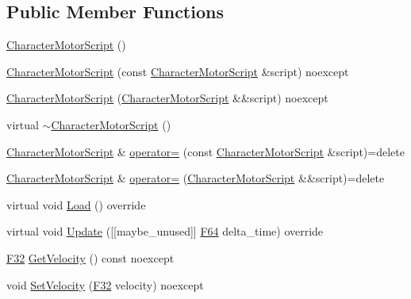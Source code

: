 \subsection*{Public Member Functions}
\begin{DoxyCompactItemize}
\item 
\hyperlink{classmage_1_1script_1_1_character_motor_script_ac5147e7eca438fe01cc0bedb2ce0a750}{Character\+Motor\+Script} ()
\item 
\hyperlink{classmage_1_1script_1_1_character_motor_script_a22c2bc0693a38f12182234ba842aa6f2}{Character\+Motor\+Script} (const \hyperlink{classmage_1_1script_1_1_character_motor_script}{Character\+Motor\+Script} \&script) noexcept
\item 
\hyperlink{classmage_1_1script_1_1_character_motor_script_ad822459ba8d2bbd5a30d598c41c5a281}{Character\+Motor\+Script} (\hyperlink{classmage_1_1script_1_1_character_motor_script}{Character\+Motor\+Script} \&\&script) noexcept
\item 
virtual \hyperlink{classmage_1_1script_1_1_character_motor_script_a83ed3c2fcb60cef046499fd9c44f86ee}{$\sim$\+Character\+Motor\+Script} ()
\item 
\hyperlink{classmage_1_1script_1_1_character_motor_script}{Character\+Motor\+Script} \& \hyperlink{classmage_1_1script_1_1_character_motor_script_ac0367e5e6fb8adfe3b9a962f1ca72b4c}{operator=} (const \hyperlink{classmage_1_1script_1_1_character_motor_script}{Character\+Motor\+Script} \&script)=delete
\item 
\hyperlink{classmage_1_1script_1_1_character_motor_script}{Character\+Motor\+Script} \& \hyperlink{classmage_1_1script_1_1_character_motor_script_a00ca2aa38ca4a2557a783ffc31068801}{operator=} (\hyperlink{classmage_1_1script_1_1_character_motor_script}{Character\+Motor\+Script} \&\&script)=delete
\item 
virtual void \hyperlink{classmage_1_1script_1_1_character_motor_script_aa07409b305e1766b69134f7884be7395}{Load} () override
\item 
virtual void \hyperlink{classmage_1_1script_1_1_character_motor_script_a75683c4b8db184174b48dd7e4989c016}{Update} (\mbox{[}\mbox{[}maybe\+\_\+unused\mbox{]}\mbox{]} \hyperlink{namespacemage_ad26233bbec640deda836e572c1a23708}{F64} delta\+\_\+time) override
\item 
\hyperlink{namespacemage_aa97e833b45f06d60a0a9c4fc22ae02c0}{F32} \hyperlink{classmage_1_1script_1_1_character_motor_script_a24edb3337af40e7326c424bc6b93c3fa}{Get\+Velocity} () const noexcept
\item 
void \hyperlink{classmage_1_1script_1_1_character_motor_script_a51c9b8317670fc0ae554bfb0cac11aee}{Set\+Velocity} (\hyperlink{namespacemage_aa97e833b45f06d60a0a9c4fc22ae02c0}{F32} velocity) noexcept
\end{DoxyCompactItemize}
